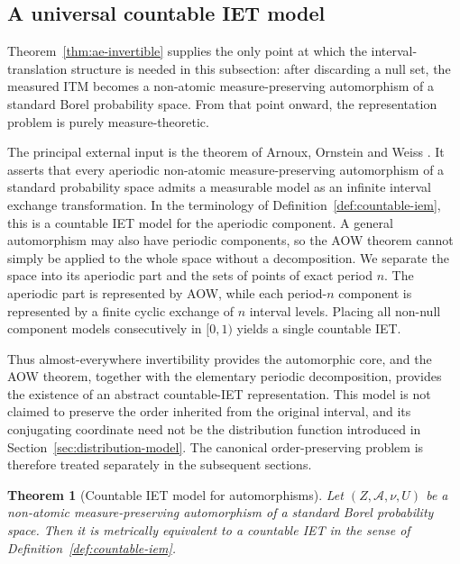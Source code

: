 \documentclass[11pt]{amsart}
\theoremstyle{plain}
\newtheorem{theorem}{Theorem}[section]
\theoremstyle{definition}
\theoremstyle{remark}
\begin{document}
\subsection{A universal countable IET model}

Theorem~\ref{thm:ae-invertible} supplies the only point at which the interval-translation
structure is needed in this subsection: after discarding a null set, the measured ITM becomes
a non-atomic measure-preserving automorphism of a standard Borel probability space. From that
point onward, the representation problem is purely measure-theoretic.

The principal external input is the theorem of Arnoux, Ornstein and Weiss
\cite{ArnouxOrnsteinWeiss1985}. It asserts that every aperiodic non-atomic
measure-preserving automorphism of a standard probability space admits a measurable model as
an infinite interval exchange transformation. In the terminology of
Definition~\ref{def:countable-iem}, this is a countable IET model for the aperiodic component.
A general automorphism may also have periodic components, so the AOW theorem cannot simply be
applied to the whole space without a decomposition. We separate the space into its aperiodic
part and the sets of points of exact period \(n\). The aperiodic part is represented by AOW,
while each period-\(n\) component is represented by a finite cyclic exchange of \(n\) interval
levels. Placing all non-null component models consecutively in \([0,1)\) yields a single
countable IET.

Thus almost-everywhere invertibility provides the automorphic core, and the AOW theorem,
together with the elementary periodic decomposition, provides the existence of an abstract
countable-IET representation. This model is not claimed to preserve the order inherited from
the original interval, and its conjugating coordinate need not be the distribution function
introduced in Section~\ref{sec:distribution-model}. The canonical order-preserving problem is
therefore treated separately in the subsequent sections.

\begin{theorem}[Countable IET model for automorphisms]
\label{thm:automorphism-countable-iem}
Let \((Z,\mathcal A,\nu,U)\) be a non-atomic measure-preserving automorphism of a standard
Borel probability space. Then it is metrically equivalent to a countable IET in the sense of Definition~\ref{def:countable-iem}.
\end{theorem}
\end{document}
